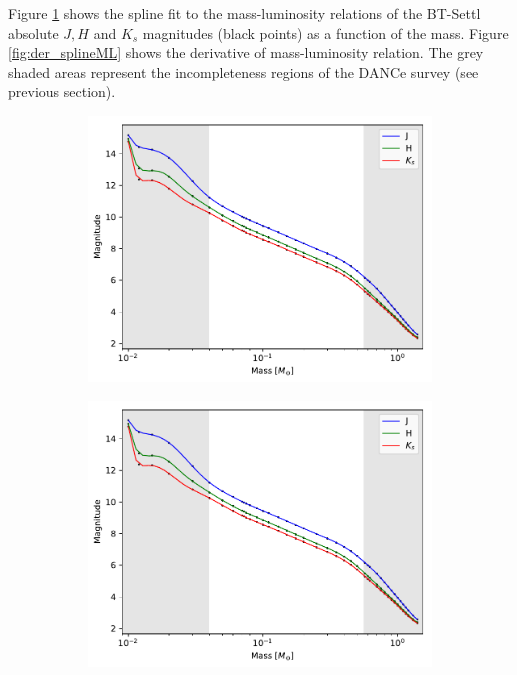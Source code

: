 Figure \ref{fig:splineML} shows the spline fit to the mass-luminosity relations of the BT-Settl absolute $J,H$ and $K_s$ magnitudes (black points) as a function of the mass. Figure \ref{fig:der_splineML} shows the derivative of mass-luminosity relation. The grey shaded areas represent the incompleteness regions of the DANCe survey (see previous section).

\begin{figure}[ht!]
    \centering
    \begin{subfigure}[t]{0.7\textwidth}
    \centering
       \includegraphics[page=1,width=\textwidth]{background/Figures/FitSpline_AllardModels.pdf}
        \caption{}
        \label{fig:splineML}
    \end{subfigure}
    \begin{subfigure}[t]{0.7\textwidth}
    \centering
     \includegraphics[page=2,width=\textwidth]{background/Figures/FitSpline_AllardModels.pdf}

\end{subfigure}
\end{figure}
